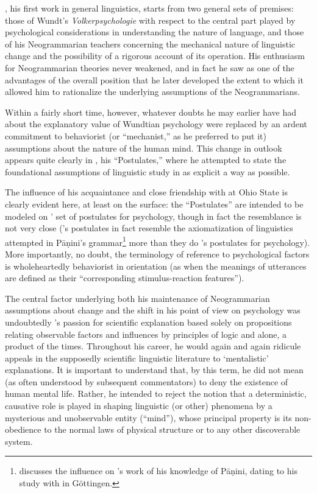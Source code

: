 \citet{bloomfield14:introduction}, his first work in general
linguistics, starts from two general sets of premises: those of
Wundt's \emph{Volkerpsychologie} with respect to the central part
played by psychological considerations in understanding the nature of
language, and those of his Neogrammarian teachers concerning the
mechanical nature of linguistic change and the possibility of a
rigorous account of its operation. His enthusiasm for Neogrammarian
theories never weakened, and in fact he saw as one of the advantages
of the overall position that he later developed the extent to which it
allowed him to rationalize the underlying assumptions of the
Neogrammarians.

Within a fairly short time, however, whatever doubts he may earlier
have had about the explanatory value of Wundtian psychology were
replaced by an ardent commitment to behaviorist (or ``mechanist,'' as he
preferred to put it) assumptions about the nature of the human
mind. This {change} in outlook appears quite clearly in
\citealt{bloomfield26:postulates}, his ``Postulates,'' where he
attempted to state the foundational assumptions of linguistic study in
as explicit a way as possible.

The influence of his acquaintance and close friendship with {\Weiss} at
Ohio State is clearly evident here, at least on the surface: the
``Postulates'' are intended to be modeled on {\Weiss}' set of postulates
for psychology, though in fact the resemblance is not very close
({\Bloomfield}'s postulates in fact resemble the axiomatization of
linguistics attempted in Pāṇini's
grammar\footnote{\citet{rogers87:bloomfield.panini} discusses the
  influence on {\Bloomfield}'s work of his knowledge of Pāṇini, dating to
  his study with  in Göttingen.}  more than they do
{\Weiss}'s postulates for psychology). More importantly, no doubt, the
terminology of reference to psychological factors is wholeheartedly
behaviorist in orientation (as when the meanings of utterances are
defined as their ``corresponding stimulus-reaction features'').

The central factor underlying both his maintenance of Neogrammarian
assumptions about change and the shift in his point of view on
psychology was undoubtedly {\Bloomfield}'s passion for scientific
{explanation} based solely on propositions relating observable factors
and influences by principles of logic and  alone, a product
of the times. Throughout his career, he would again and again ridicule
appeals in the supposedly scientific linguistic literature to
`mentalistic' explanations. It is important to understand that, by
this term, he did not mean (as often understood by subsequent
commentators) to deny the existence of human mental life. Rather, he
intended to reject the notion that a deterministic, causative role is
played in shaping linguistic (or other) phenomena by a mysterious and
unobservable entity (``mind''), whose principal property is its
non-obedience to the normal laws of physical structure or to any other
discoverable system.

